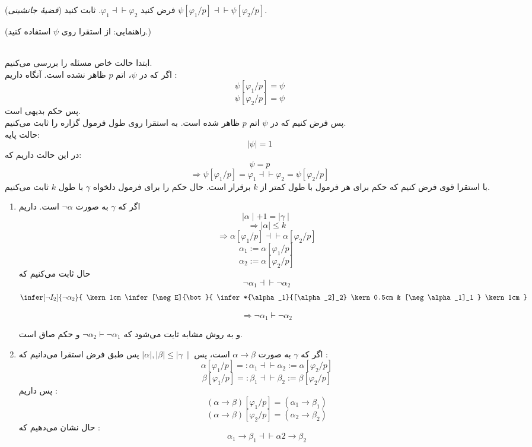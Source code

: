 	(\emph{قضیهٔ جانشینی})
	فرض کنید
	$\varphi_1\dashv\vdash\varphi_2$.
	ثابت کنید
	$\psi[\varphi_1/p]\dashv\vdash\psi[\varphi_2/p]$.
	
	(راهنمایی: از استقرا روی $\psi$ استفاده کنید.)
	\begin{ans}
	\\	ابتدا حالت خاص مسئله را بررسی می‌کنیم. \\ اگر که در $\psi$، اتم ${p}$ ظاهر نشده است. آنگاه  داریم : \\
	$$
		\psi[\varphi_1/p] = \psi
	$$
	$$
		\psi[\varphi_2/p] = \psi
	$$
	پس حکم بدیهی است.\\
	پس فرض کنیم که در $\psi$ اتم $p$ ظاهر شده است. به استقرا روی طول فرمول گزاره را ثابت می‌کنیم. \\
	حالت پایه:
	$$ \mid \psi \mid = 1 $$
	 در این حالت داریم که‌:
	 $$ \psi = p $$
	$$\Longrightarrow {\psi[\varphi_1/p] = \varphi_1 \dashv\vdash \varphi_2 = \psi[\varphi_2/p]}$$
	با استقرا قوی فرض کنیم که حکم برای هر فرمول با طول کمتر از $k$ برقرار است. حال حکم را برای فرمول‌ دلخواه $\gamma$ با طول $k$ ثابت می‌کنیم.
	\quad\vspace{0.5 cm}
	\begin{enumerate}
		\item اگر که $\gamma$ به صورت $\neg \alpha$ است. داریم
		$$\mid \alpha \mid + 1 = \mid \gamma \mid$$
		$$\Longrightarrow {\mid \alpha \mid \le k}$$
		$$\Longrightarrow {\alpha[\varphi_1/p] \dashv\vdash \alpha[\varphi_2/p]}$$
		$$
			\alpha_1 := \alpha[\varphi_1/p]
		$$
		$$
			\alpha_2 := \alpha[\varphi_2/p]
		$$
		حال ثابت می‌کنیم که
		$$ \neg \alpha_1 \dashv\vdash \neg \alpha_2$$  
		$$
			\infer[\neg I_2]{\neg \alpha_2}{
				\kern 1cm \infer[\neg E]{\bot}{
					\infer*{\alpha_1}{[\alpha_2]_2} \kern 0.5cm
					& 
					[\neg \alpha_1]_1
				} \kern 1cm
			}
		$$
	
		$$
			\Longrightarrow {\neg \alpha_1 \vdash \neg \alpha_2}	
		$$
	
	و به روش مشابه ثایت می‌شود که
		$ \neg \alpha_2 \vdash \neg \alpha_1$
	و حکم صاق است.
	\item   
		اگر که $\gamma$ به صورت
		$\alpha \rightarrow \beta$
		است، پس 
		$\mid \alpha \mid , \mid \beta \mid \le \mid \gamma\ \mid$
		پس طبق فرض استقرا می‌دانیم که :
		$$ 
		\alpha[\varphi_1/p] =: \alpha_1 \dashv\vdash \alpha_2 := \alpha[\varphi_2/p]
		$$
		$$
		\beta[\varphi_1/p] =: \beta_1 \dashv\vdash \beta_2 := 			\beta[\varphi_2/p]
		$$
			پس داریم :
		$$
		 	(\alpha \rightarrow \beta) [\varphi_1/p] = (\alpha_1 \rightarrow \beta_1)
		$$
		$$
			(\alpha \rightarrow \beta) [\varphi_2/p] = (\alpha_2 \rightarrow \beta_2)
		$$
		حال نشان می‌دهیم که :
		$$
			\alpha_1 \rightarrow \beta_1 \dashv\vdash \alpha2 \rightarrow \beta_2	
		$$
		

\end{enumerate}
\end{ans}
